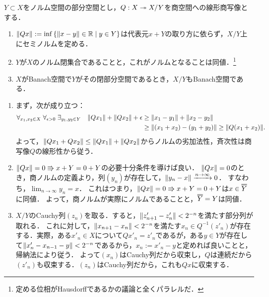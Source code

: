 \documentclass[uplatex,dvipdfmx]{jsreport}
\begin{document}
\begin{proposition}[商空間]\label{prop-quotient-Banach-space}
    $Y\subset X$をノルム空間の部分空間とし，$Q:X\twoheadrightarrow X/Y$を商空間への線形商写像とする．
    \begin{enumerate}
        \item $\|Qx\|:=\inf\left\{\|x-y\|\in\mathbb{R}\mid y\in Y\right\}$は代表元$x+Y$の取り方に依らず，$X/Y$上にセミノルムを定める．
        \item $Y$が$X$のノルム閉集合であることと，これがノルムとなることは同値．\footnote{定める位相がHausdorffであるかの議論と全くパラレルだ．}
        \item $X$がBanach空間で$Y$がその閉部分空間であるとき，$X/Y$もBanach空間である．
    \end{enumerate}
\end{proposition}
\begin{Proof}\mbox{}
    \begin{enumerate}
        \item まず，次が成り立つ：
        \begin{align*}
            \forall_{x_1,x_2\in X}\;\forall_{\epsilon>0}\;\exists_{y_1,y_2\in Y}\quad\|Qx_1\|+\|Qx_2\|+\epsilon&\ge\|x_1-y_1\|+\|x_2-y_2\|\\
            &\ge\|(x_1+x_2)-(y_1+y_2)\|\ge\|Q(x_1+x_2)\|.
        \end{align*}
        よって，$\|Qx_1+Qx_2\|\le\|Qx_1\|+\|Qx_2\|$からノルムの劣加法性，斉次性は商写像$Q$の線形性から従う．
        \item $\|Qx\|=0\Rrightarrow x+Y=0+Y$の必要十分条件を導けば良い．
        $\|Qx\|=0$のとき，商ノルムの定義より，列$(y_n)$が存在して，$\|y_n-x\|\xrightarrow{n\to\infty}0$．
        すなわち，$\lim_{n\to\infty}y_n=x$．
        これはつまり，$\|Qx\|=0\Rrightarrow x+Y=0+Y$は$x\in\oo{Y}$に同値．
        よって，商ノルムが実際にノルムであることと，$\oo{Y}=Y$は同値．
        \item $X/Y$のCauchy列$(z_n)$を取る．すると，$\|z'_{n+1}-z'_n\|<2^{-n}$を満たす部分列が取れる．
        これに対して，$\|x_{n+1}-x_n\|<2^{-n}$を満たす$x_n\in Q^{-1}(z'_n)$が存在する．実際，ある$x'_n\in X$について$Qx'_n=z'_n$であるが，ある$y\in Y$が存在して$\|x'_n-x_{n-1}-y\|<2^{-n}$であるから，$x_n:=x'_n-y$と定めれば良いことと，帰納法により従う．
        よって$(x_n)$はCauchy列だから収束し，$Q$は連続だから$(z'_n)$も収束する．$(z_n)$はCauchy列だから，これも$Qx$に収束する．
    \end{enumerate}
\end{Proof}
\end{document}
